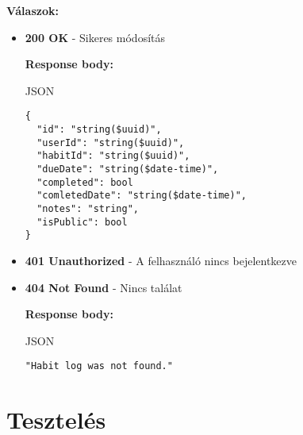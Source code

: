\documentclass[12pt]{report}
\begin{document}
\begin{description}
    \vspace{0.5cm}
    \textbf{Válaszok:}
    \begin{itemize}
      \item \textbf{200 OK} - Sikeres módosítás

        \textbf{Response body:}
        \begin{codeblock}{JSON}
          \begin{verbatim}
{
  "id": "string($uuid)",
  "userId": "string($uuid)",
  "habitId": "string($uuid)",
  "dueDate": "string($date-time)",
  "completed": bool
  "comletedDate": "string($date-time)",
  "notes": "string",
  "isPublic": bool
}
          \end{verbatim}
        \end{codeblock}

      \item \textbf{401 Unauthorized} - A felhasználó nincs bejelentkezve

      \item \textbf{404 Not Found} - Nincs találat

        \textbf{Response body:}
        \begin{codeblock}{JSON}
          \begin{verbatim} 
"Habit log was not found."
          \end{verbatim}
        \end{codeblock}
    \end{itemize}
\end{description}

\chapter{Tesztelés}
\end{document}
